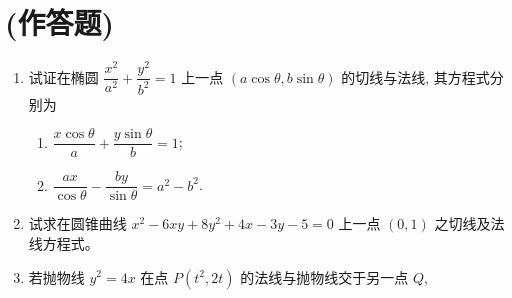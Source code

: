 \documentclass[10pt]{article}
\begin{document}
\section*{(作答题)}
\begin{enumerate}
  \item 试证在椭圆 $\dfrac{x^{2}}{a^{2}}+\dfrac{y^{2}}{b^{2}}=1$ 上一点 $(a \cos \theta, b \sin \theta)$ 的切线与法线, 其方程式分别为
  \begin{enumerate}
    \item $\dfrac{x \cos \theta}{a}+\dfrac{y \sin \theta}{b}=1$;
    \item $\dfrac{a x}{\cos \theta}-\dfrac{b y}{\sin \theta}=a^{2}-b^{2}$.
  \end{enumerate}
  \item 试求在圆锥曲线 $x^{2}-6 x y+8 y^{2}+4 x-3 y-5=0$ 上一点 $(0,1)$ 之切线及法线方程式。
  \item 若抛物线 $y^{2}=4 x$ 在点 $P\left(t^{2}, 2 t\right)$ 的法线与抛物线交于另一点 $Q$,
 

\end{enumerate}
\end{document}
